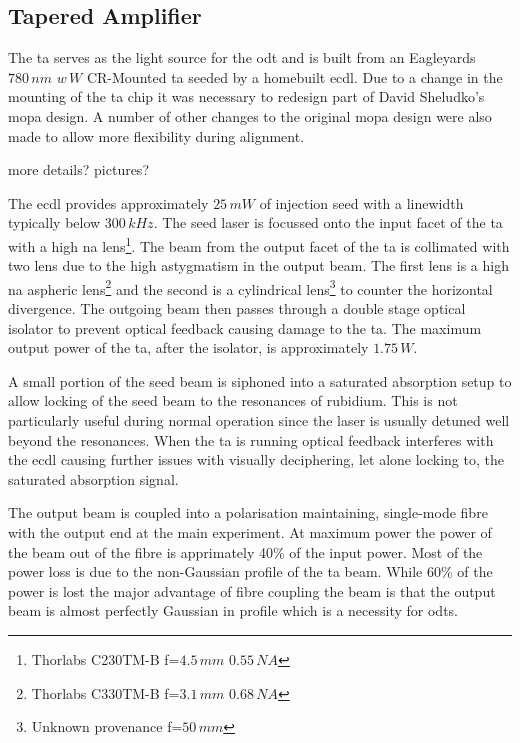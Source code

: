 \subsection{Tapered Amplifier}
The \gls{ta} serves as the light source for the \gls{odt} and is built from an Eagleyards $780\,\unit{nm}$ $w\,\unit{W}$ CR-Mounted \gls{ta} seeded by a homebuilt \gls{ecdl}. Due to a change in the mounting of the \gls{ta} chip it was necessary to redesign part of David Sheludko's \gls{mopa} design\cite{sheludko_shaped_2010}. A number of other changes to the original \gls{mopa} design were also made to allow more flexibility during alignment.

{\color{red} more details? pictures?}

The \gls{ecdl} provides approximately $25\,\unit{mW}$ of injection seed with a linewidth typically below $300\,\unit{kHz}$. The seed laser is focussed onto the input facet of the \gls{ta} with a high \gls{na} lens\footnote{Thorlabs C230TM-B f=$4.5\,\unit{mm}$ $0.55\,\unit{NA}$}. The beam from the output facet of the \gls{ta} is collimated with two lens due to the high astygmatism in the output beam. The first lens is a high \gls{na} aspheric lens\footnote{Thorlabs C330TM-B f=$3.1\,\unit{mm}$ $0.68\,\unit{NA}$} and the second is a cylindrical lens\footnote{Unknown provenance f=$50\,\unit{mm}$} to counter the horizontal divergence. The outgoing beam then passes through a double stage optical isolator to prevent optical feedback causing damage to the \gls{ta}. The maximum output power of the \gls{ta}, after the isolator, is approximately $1.75\,\unit{W}$.

A small portion of the seed beam is siphoned into a saturated absorption setup to allow locking of the seed beam to the resonances of rubidium. This is not particularly useful during normal operation since the laser is usually detuned well beyond the resonances. When the \gls{ta} is running optical feedback interferes with the \gls{ecdl} causing further issues with visually deciphering, let alone locking to, the saturated absorption signal.

The output beam is coupled into a polarisation maintaining, single-mode fibre with the output end at the main experiment. At maximum power the power of the beam out of the fibre is apprimately 40\% of the input power. Most of the power loss is due to the non-Gaussian profile of the \gls{ta} beam. While 60\% of the power is lost the major advantage of fibre coupling the beam is that the output beam is almost perfectly Gaussian in profile which is a necessity for \glspl{odt}.

